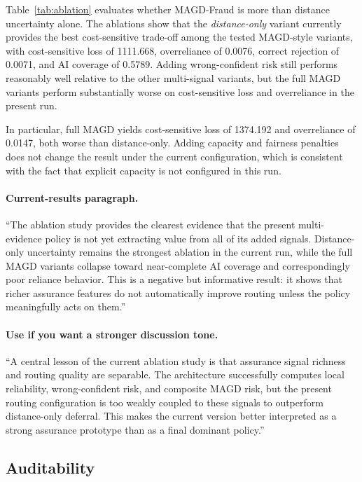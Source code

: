 Table~\ref{tab:ablation} evaluates whether MAGD-Fraud is more than distance uncertainty alone. The ablations show that the \emph{distance-only} variant currently provides the best cost-sensitive trade-off among the tested MAGD-style variants, with cost-sensitive loss of 1111.668, overreliance of 0.0076, correct rejection of 0.0071, and AI coverage of 0.5789. Adding wrong-confident risk still performs reasonably well relative to the other multi-signal variants, but the full MAGD variants perform substantially worse on cost-sensitive loss and overreliance in the present run.

In particular, full MAGD yields cost-sensitive loss of 1374.192 and overreliance of 0.0147, both worse than distance-only. Adding capacity and fairness penalties does not change the result under the current configuration, which is consistent with the fact that explicit capacity is not configured in this run.

\paragraph{Current-results paragraph.}
``The ablation study provides the clearest evidence that the present multi-evidence policy is not yet extracting value from all of its added signals. Distance-only uncertainty remains the strongest ablation in the current run, while the full MAGD variants collapse toward near-complete AI coverage and correspondingly poor reliance behavior. This is a negative but informative result: it shows that richer assurance features do not automatically improve routing unless the policy meaningfully acts on them.''

\paragraph{Use if you want a stronger discussion tone.}
``A central lesson of the current ablation study is that assurance signal richness and routing quality are separable. The architecture successfully computes local reliability, wrong-confident risk, and composite MAGD risk, but the present routing configuration is too weakly coupled to these signals to outperform distance-only deferral. This makes the current version better interpreted as a strong assurance prototype than as a final dominant policy.''

\subsection{Auditability}
\label{subsec:results_auditability}

